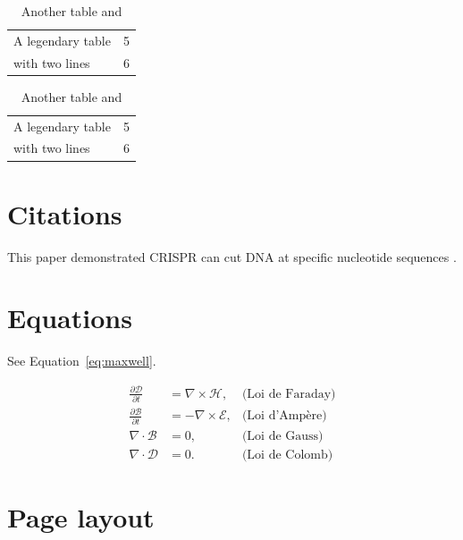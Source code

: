 \begin{table}
    \centering
    \caption{Another table  and }
    \label{tab:legend}

    \begin{subtable}{0.5\linewidth}
        \centering
        \label{tab:1a}
        \begin{tabular}{lc} \toprule
        A legendary table & 5 \\
        with two lines    & 6 \\ \bottomrule
        \end{tabular}
    \end{subtable}%
    \begin{subtable}{0.5\linewidth}
        \centering
        \label{tab:1b}
        \begin{tabular}{lc} \toprule
        A legendary table & 5 \\
        with two lines    & 6 \\ \bottomrule
        \end{tabular}
    \end{subtable}
\end{table}


\section{Citations}
This paper demonstrated CRISPR can cut DNA at specific nucleotide sequences \cite{Jinek2012}.


\section{Equations}
See Equation~\ref{eq:maxwell}.

\begin{equation}
    \label{eq:maxwell}
    \begin{aligned}
    \frac{\partial\mathcal{D}}{\partial t} & = \nabla\times\mathcal{H},   & \text{(Loi de Faraday)}\\
    \frac{\partial\mathcal{B}}{\partial t} & = -\nabla\times\mathcal{E},  & \text{(Loi d'Ampère)}\\
    \nabla\cdot\mathcal{B}                 & = 0,                         & \text{(Loi de Gauss)}\\
    \nabla\cdot\mathcal{D}                 & = 0.                         & \text{(Loi de Colomb)}
    \end{aligned}
\end{equation}

\clearpage
\section{Page layout}
\layout
